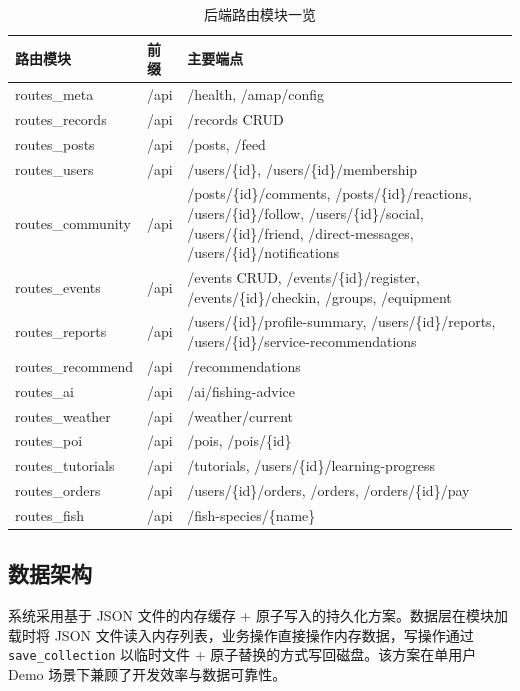 \documentclass[12pt,a4paper]{ctexart}
\begin{document}
\begin{table}[H]
  \centering
  \caption{后端路由模块一览}
  \label{tab:backend-routes}
  \begin{tabular}{p{3.5cm}p{2.5cm}p{6cm}}
    \toprule
    \textbf{路由模块} & \textbf{前缀} & \textbf{主要端点} \\
    \midrule
    routes\_meta & /api & /health, /amap/config \\
    routes\_records & /api & /records CRUD \\
    routes\_posts & /api & /posts, /feed \\
    routes\_users & /api & /users/\{id\}, /users/\{id\}/membership \\
    routes\_community & /api & /posts/\{id\}/comments, /posts/\{id\}/reactions, /users/\{id\}/follow, /users/\{id\}/social, /users/\{id\}/friend, /direct-messages, /users/\{id\}/notifications \\
    routes\_events & /api & /events CRUD, /events/\{id\}/register, /events/\{id\}/checkin, /groups, /equipment \\
    routes\_reports & /api & /users/\{id\}/profile-summary, /users/\{id\}/reports, /users/\{id\}/service-recommendations \\
    routes\_recommend & /api & /recommendations \\
    routes\_ai & /api & /ai/fishing-advice \\
    routes\_weather & /api & /weather/current \\
    routes\_poi & /api & /pois, /pois/\{id\} \\
    routes\_tutorials & /api & /tutorials, /users/\{id\}/learning-progress \\
    routes\_orders & /api & /users/\{id\}/orders, /orders, /orders/\{id\}/pay \\
    routes\_fish & /api & /fish-species/\{name\} \\
    \bottomrule
  \end{tabular}
\end{table}

\subsection{数据架构}

系统采用基于 JSON 文件的内存缓存 + 原子写入的持久化方案。数据层在模块加载时将 JSON 文件读入内存列表，业务操作直接操作内存数据，写操作通过 \texttt{save\_collection} 以临时文件 + 原子替换的方式写回磁盘。该方案在单用户 Demo 场景下兼顾了开发效率与数据可靠性。
\end{document}
